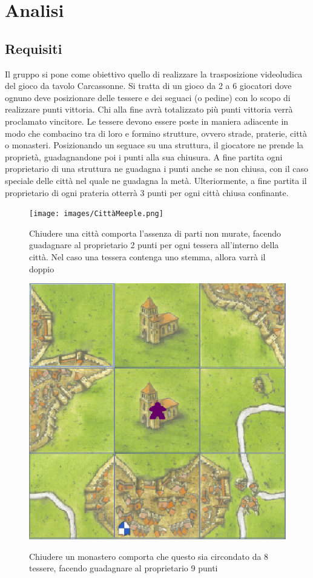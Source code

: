 \section{Analisi}
\subsection{Requisiti}

Il gruppo si pone come obiettivo quello di realizzare la trasposizione videoludica del gioco da tavolo Carcassonne. Si tratta di un gioco da 2 a 6 giocatori dove ognuno deve posizionare delle tessere e dei seguaci (o pedine) con lo scopo di realizzare punti vittoria. Chi alla fine avrà totalizzato più punti vittoria verrà proclamato vincitore. Le tessere devono essere poste in maniera adiacente in modo che combacino tra di loro e formino strutture, ovvero strade, praterie, città o monasteri. Posizionando un seguace su una struttura, il giocatore ne prende la proprietà, guadagnandone poi i punti alla sua chiusura. A fine partita ogni proprietario di una struttura ne guadagna i punti anche se non chiusa, con il caso speciale delle città nel quale ne guadagna la metà. Ulteriormente, a fine partita il proprietario di ogni prateria otterrà 3 punti per ogni città chiusa confinante.

\begin{figure}[]
    {\texttt{[image: images/CittàMeeple.png]}}

    \caption{Chiudere una città comporta l’assenza di parti non murate, facendo guadagnare al proprietario 2 punti per ogni tessera all'interno della città. Nel caso una tessera contenga uno stemma, allora varrà il doppio}
\end{figure}

\begin{figure}[]
    {\includegraphics[]{images/MonasteroMeeple.png}}

    \caption{Chiudere un monastero comporta che questo sia circondato da 8 tessere, facendo guadagnare al proprietario 9 punti}
\end{figure}

